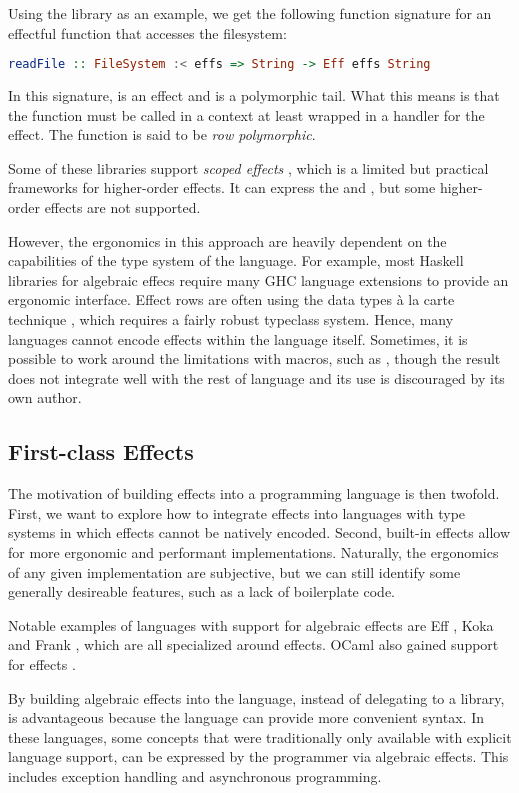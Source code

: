Using the  library as an example, we get the following function signature for an effectful function that accesses the filesystem:
\begin{lstlisting}[language=Haskell]
readFile :: FileSystem :< effs => String -> Eff effs String
\end{lstlisting}
In this signature,  is an effect and  is a polymorphic tail. What this means is that the  function must be called in a context at least wrapped in a handler for the  effect. The function is said to be \emph{row polymorphic}.

Some of these libraries support \emph{scoped effects} \autocite{wu_effect_2014}, which is a limited but practical frameworks for higher-order effects. It can express the \olocal and \ocatch, but some higher-order effects are not supported.

However, the ergonomics in this approach are heavily dependent on the capabilities of the type system of the language. For example, most Haskell libraries for algebraic effecs require many GHC language extensions to provide an ergonomic interface. Effect rows are often using the data types à la carte technique \autocite{swierstra_data_2008}, which requires a fairly robust typeclass system. Hence, many languages cannot encode effects within the language itself. Sometimes, it is possible to work around the limitations with macros, such as , though the result does not integrate well with the rest of language and its use is discouraged by its own author.

\subsection{First-class Effects}

The motivation of building effects into a programming language is then twofold. First, we want to explore how to integrate effects into languages with type systems in which effects cannot be natively encoded. Second, built-in effects allow for more ergonomic and performant implementations. Naturally, the ergonomics of any given implementation are subjective, but we can still identify some generally desireable features, such as a lack of boilerplate code.

Notable examples of languages with support for algebraic effects are Eff \autocite{bauer_programming_2015}, Koka \autocite{leijen_type_2017} and Frank \autocite{lindley_be_2017}, which are all specialized around effects. OCaml also gained support for effects \autocite{sivaramakrishnan_retrofitting_2021}. 

By building algebraic effects into the language, instead of delegating to a library, is advantageous because the language can provide more convenient syntax. In these languages, some concepts that were traditionally only available with explicit language support, can be expressed by the programmer via algebraic effects. This includes exception handling and asynchronous programming.

